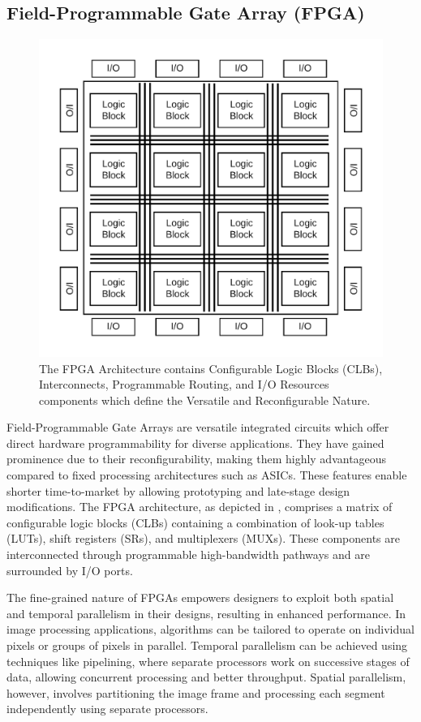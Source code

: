 \subsection{Field-Programmable Gate Array (FPGA)}

\begin{figure}[!ht]
\centering
\includegraphics[width=0.7\linewidth]{Images/FPGA.png}
\caption[FPGA Architecture]{The FPGA Architecture contains Configurable Logic Blocks (CLBs), Interconnects, Programmable Routing, and I/O Resources components which define the Versatile and Reconfigurable Nature.}
\label{fig:FPGA}
\end{figure} 

Field-Programmable Gate Arrays are versatile integrated circuits which offer direct hardware programmability for diverse applications. They have gained prominence due to their reconfigurability, making them highly advantageous compared to fixed processing architectures such as ASICs. These features enable shorter time-to-market by allowing prototyping and late-stage design modifications. The FPGA architecture, as depicted in , comprises a matrix of configurable logic blocks (CLBs) containing a combination of look-up tables (LUTs), shift registers (SRs), and multiplexers (MUXs). These components are interconnected through programmable high-bandwidth pathways and are surrounded by I/O ports.

The fine-grained nature of FPGAs empowers designers to exploit both spatial and temporal parallelism in their designs, resulting in enhanced performance. In image processing applications, algorithms can be tailored to operate on individual pixels or groups of pixels in parallel. Temporal parallelism can be achieved using techniques like pipelining, where separate processors work on successive stages of data, allowing concurrent processing and better throughput. Spatial parallelism, however, involves partitioning the image frame and processing each segment independently using separate processors.

